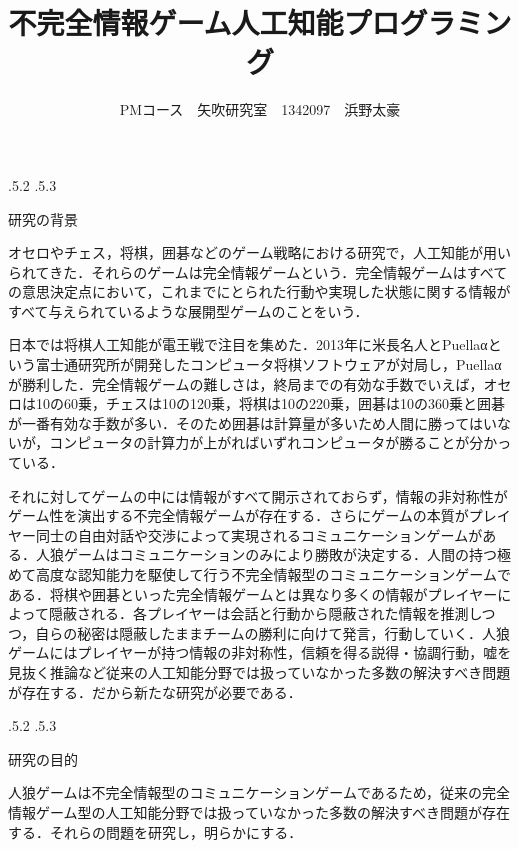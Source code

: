 \documentclass[uplatex]{jsarticle}
\title{\vspace{-14mm}不完全情報ゲーム人工知能プログラミング}
\author{PMコース　矢吹研究室　1342097　浜野太豪}
\date{}%
\makeatletter
\renewcommand{\section}{%
    \if@slide\clearpage\fi
    \@startsection{section}{1}{\z@}%
    {\Cvs \@plus.5\Cdp \@minus.2\Cdp}%
    {.5\Cvs \@plus.3\Cdp}%
    {\normalfont\raggedright}}
\makeatother
\begin{document}
\maketitle





\section{研究の背景}

オセロやチェス，将棋，囲碁などのゲーム戦略における研究で，人工知能が用いられてきた．それらのゲームは完全情報ゲームという．完全情報ゲームはすべての意思決定点において，これまでにとられた行動や実現した状態に関する情報がすべて与えられているような展開型ゲームのことをいう．\cite{okumura2013}

日本では将棋人工知能が電王戦で注目を集めた．2013年に米長名人とPuellaαという富士通研究所が開発したコンピュータ将棋ソフトウェアが対局し，Puellaαが勝利した．完全情報ゲームの難しさは，終局までの有効な手数でいえば，オセロは10の60乗，チェスは10の120乗，将棋は10の220乗，囲碁は10の360乗と囲碁が一番有効な手数が多い．\cite{jinro2}そのため囲碁は計算量が多いため人間に勝ってはいないが，コンピュータの計算力が上がればいずれコンピュータが勝ることが分かっている．

それに対してゲームの中には情報がすべて開示されておらず，情報の非対称性がゲーム性を演出する不完全情報ゲームが存在する．さらにゲームの本質がプレイヤー同士の自由対話や交渉によって実現されるコミュニケーションゲームがある．人狼ゲームはコミュニケーションのみにより勝敗が決定する．人間の持つ極めて高度な認知能力を駆使して行う不完全情報型のコミュニケーションゲームである．将棋や囲碁といった完全情報ゲームとは異なり多くの情報がプレイヤーによって隠蔽される．各プレイヤーは会話と行動から隠蔽された情報を推測しつつ，自らの秘密は隠蔽したままチームの勝利に向けて発言，行動していく．人狼ゲームにはプレイヤーが持つ情報の非対称性，信頼を得る説得・協調行動，嘘を見抜く推論など従来の人工知能分野では扱っていなかった多数の解決すべき問題が存在する．\cite{jinro1}だから新たな研究が必要である．


\section{研究の目的}

人狼ゲームは不完全情報型のコミュニケーションゲームであるため，従来の完全情報ゲーム型の人工知能分野では扱っていなかった多数の解決すべき問題が存在する．それらの問題を研究し，明らかにする．
\end{document}
